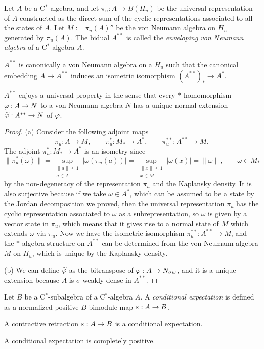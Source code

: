 \documentclass{../../large}
\begin{document}
\begin{prb}
Let $A$ be a C$^*$-algebra, and let $\pi_u:A\to B(H_u)$ be the universal representation of $A$ constructed as the direct sum of the cyclic representations associated to all the states of $A$.
Let $M:=\pi_u(A)''$ be the von Neumann algebra on $H_u$ generated by $\pi_u(A)$.
The bidual $A^{**}$ is called the \emph{enveloping von Neumann algebra} of a C$^*$-algebra $A$.
\begin{parts}
\item $A^{**}$ is canonically a von Neumann algebra on a $H_u$ such that the canonical embedding $A\to A^{**}$ induces an isometric isomorphism $(A^{**})_*\to A^*$.
\item $A^{**}$ enjoys a universal property in the sense that every $*$-homomorphism $\varphi:A\to N$ to a von Neumann algebra $N$ has a unique normal extension $\widetilde{\varphi}:A^{**}\to N$ of $\varphi$.
\end{parts}
\end{prb}
\begin{proof}
(a)
Consider the following adjoint maps
\[\pi_u:A\to M,\qquad\pi_u^*:M_*\to A^*,\qquad\pi_u^{**}:A^{**}\to M.\]
The adjoint $\pi_u^*:M_*\to A^*$ is an isometry since
\[\|\pi_u^*(\omega)\|=\sup_{\substack{\|a\|\le1\\a\in A}}|\omega(\pi_u(a))|=\sup_{\substack{\|x\|\le1\\x\in M}}|\omega(x)|=\|\omega\|,\qquad \omega\in M_*\]
by the non-degeneracy of the representation $\pi_u$ and the Kaplansky density.
It is also surjective because if we take $\omega\in A^*$, which can be assumed to be a state by the Jordan decomposition we proved, then the universal representation $\pi_u$ has the cyclic representation associated to $\omega$ as a subrepresentation, so $\omega$ is given by a vector state in $\pi_u$, which means that it gives rise to a normal state of $M$ which extends $\omega$ via $\pi_u$.
Now we have the isometric isomorphism $\pi_u^{**}:A^{**}\to M$, and the $*$-algebra structure on $A^{**}$ can be determined from the von Neumann algebra $M$ on $H_u$, which is unique by the Kaplansky density.

(b)
We can define $\widetilde{\varphi}$ as the bitranspose of $\varphi:A\to N_{\sigma w}$, and it is a unique extension because $A$ is $\sigma$-weakly dense in $A^{**}$.
\end{proof}



\begin{prb}
Let $B$ be a C$^*$-subalgebra of a C$^*$-algebra $A$.
A \emph{conditional expectation} is defined as a normalized positive $B$-bimodule map $\varepsilon:A\to B$.
\begin{parts}
\item A contractive retraction $\varepsilon:A\to B$ is a conditional expectation.
\item A conditional expectation is completely positive.
\end{parts}
\end{prb}
\end{document}
